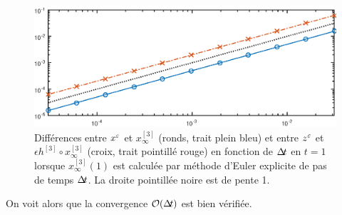 \begin{figure}[!h]
\centering
\includegraphics[width=.9\textwidth]{img/ann/erreur_manifold_euler.eps}
\caption{Différences entre $x^{\varepsilon}$ et $x^{[3]}_{\infty}$ (ronds, trait plein bleu) et entre $z^{\varepsilon}$ et $\epsilon h^{[3]}\circ x^{[3]}_{\infty}$ (croix, trait pointillé rouge) en fonction de $\Delta\!\!\!\ t$ en $t=1$ lorsque $x^{[3]}_{\infty}(1)$ est calculée par méthode d'Euler explicite de pas de temps $\Delta\!\!\!\ t$. La droite pointillée noire est de pente 1.}
\end{figure}

On voit alors que la convergence $\mathcal{O}(\Delta\!\!\!\ t)$ est bien vérifiée. 